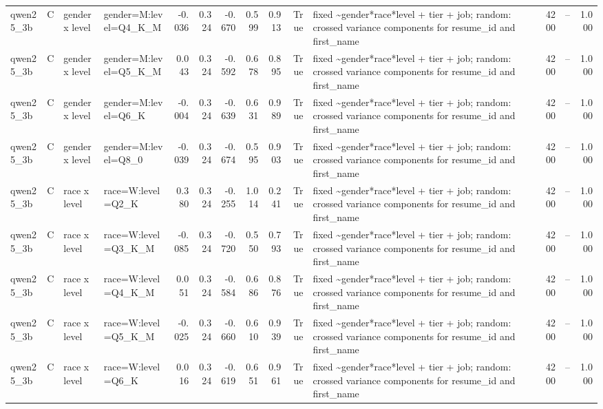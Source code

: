 \begin{tabular}{llllrrrrrrlrlr}
qwen25\_3b & C & gender x level & gender=M:level=Q4\_K\_M & -0.036 & 0.324 & -0.670 & 0.599 & 0.913 & True & fixed \textasciitilde \space gender*race*level + tier + job; random: crossed variance components for resume\_id and first\_name & 4200 & -- & 1.000 \\
qwen25\_3b & C & gender x level & gender=M:level=Q5\_K\_M & 0.043 & 0.324 & -0.592 & 0.678 & 0.895 & True & fixed \textasciitilde \space gender*race*level + tier + job; random: crossed variance components for resume\_id and first\_name & 4200 & -- & 1.000 \\
qwen25\_3b & C & gender x level & gender=M:level=Q6\_K & -0.004 & 0.324 & -0.639 & 0.631 & 0.989 & True & fixed \textasciitilde \space gender*race*level + tier + job; random: crossed variance components for resume\_id and first\_name & 4200 & -- & 1.000 \\
qwen25\_3b & C & gender x level & gender=M:level=Q8\_0 & -0.039 & 0.324 & -0.674 & 0.595 & 0.903 & True & fixed \textasciitilde \space gender*race*level + tier + job; random: crossed variance components for resume\_id and first\_name & 4200 & -- & 1.000 \\
qwen25\_3b & C & race x level & race=W:level=Q2\_K & 0.380 & 0.324 & -0.255 & 1.014 & 0.241 & True & fixed \textasciitilde \space gender*race*level + tier + job; random: crossed variance components for resume\_id and first\_name & 4200 & -- & 1.000 \\
qwen25\_3b & C & race x level & race=W:level=Q3\_K\_M & -0.085 & 0.324 & -0.720 & 0.550 & 0.793 & True & fixed \textasciitilde \space gender*race*level + tier + job; random: crossed variance components for resume\_id and first\_name & 4200 & -- & 1.000 \\
qwen25\_3b & C & race x level & race=W:level=Q4\_K\_M & 0.051 & 0.324 & -0.584 & 0.686 & 0.876 & True & fixed \textasciitilde \space gender*race*level + tier + job; random: crossed variance components for resume\_id and first\_name & 4200 & -- & 1.000 \\
qwen25\_3b & C & race x level & race=W:level=Q5\_K\_M & -0.025 & 0.324 & -0.660 & 0.610 & 0.939 & True & fixed \textasciitilde \space gender*race*level + tier + job; random: crossed variance components for resume\_id and first\_name & 4200 & -- & 1.000 \\
qwen25\_3b & C & race x level & race=W:level=Q6\_K & 0.016 & 0.324 & -0.619 & 0.651 & 0.961 & True & fixed \textasciitilde \space gender*race*level + tier + job; random: crossed variance components for resume\_id and first\_name & 4200 & -- & 1.000 \\

\end{tabular}
